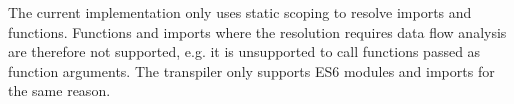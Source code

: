 The current implementation only uses static scoping to resolve imports and functions. Functions and imports where the resolution requires data flow analysis are therefore not supported, e.g. it is unsupported to call functions passed as function arguments. The transpiler only supports ES6 modules and imports for the same reason.
